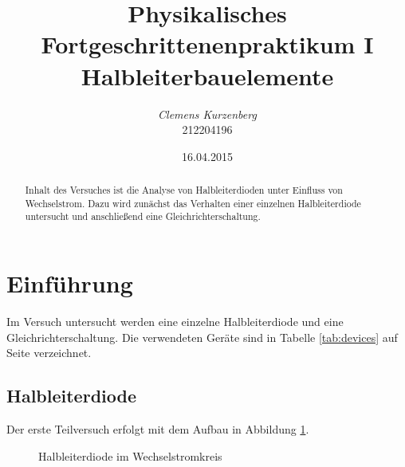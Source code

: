 \documentclass[10pt,a4paper]{scrartcl}
\title {Physikalisches Fortgeschrittenenpraktikum I\linebreak
Halbleiterbauelemente}
\author {\emph{Clemens Kurzenberg}\\212204196}
\date {16.04.2015}
\begin{document}
\maketitle

\begin{abstract}
Inhalt des Versuches ist die Analyse von Halbleiterdioden unter Einfluss von
Wechselstrom.
Dazu wird zunächst das Verhalten einer einzelnen Halbleiterdiode untersucht
und anschließend eine Gleichrichterschaltung.
\end{abstract}

\tableofcontents

\pagebreak
\section {Einführung}

Im Versuch untersucht werden eine einzelne Halbleiterdiode und eine
Gleichrichterschaltung.
Die verwendeten Geräte sind in Tabelle \ref{tab:devices} auf Seite
\pageref{tab:devices} verzeichnet.

\subsection {Halbleiterdiode}

Der erste Teilversuch erfolgt mit dem Aufbau in Abbildung \ref{fig:HL_Diode}.

\begin{figure}[!ht]
    \centering
    \caption{Halbleiterdiode im Wechselstromkreis} \label{fig:HL_Diode}
\end{figure}
\end{document}
